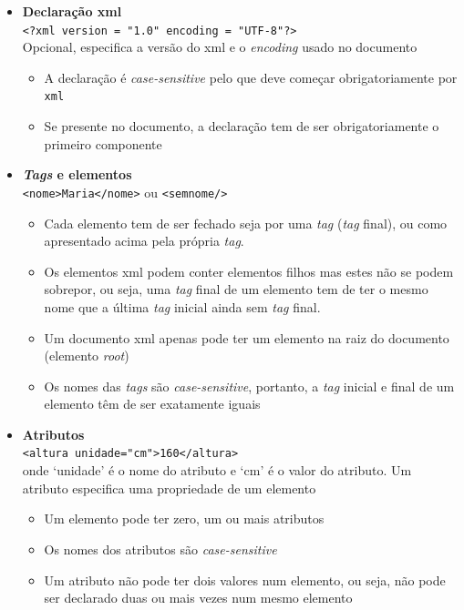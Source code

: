 \begin{itemize}
    \item \textbf{Declaração \acrshort{xml}} \\
    \verb|<?xml version = "1.0" encoding = "UTF-8"?>| \\
    Opcional, especifica a versão do \acrshort{xml} e o \textit{encoding} usado no documento
    \begin{itemize}
        \item A declaração é \textit{case-sensitive} pelo que deve começar obrigatoriamente por \texttt{xml}
        \item Se presente no documento, a declaração tem de ser obrigatoriamente o primeiro componente
    \end{itemize}
    \item \textbf{\textit{Tags} e elementos} \\
    \verb|<nome>Maria</nome>| ou \verb|<semnome/>|
    \begin{itemize}
        \item Cada elemento tem de ser fechado seja por uma \textit{tag} (\textit{tag} final), ou como apresentado acima pela própria \textit{tag}.
        \item Os elementos \acrshort{xml} podem conter elementos filhos mas estes não se podem sobrepor, ou seja, uma \textit{tag} final de um elemento tem de ter o mesmo nome que a última \textit{tag} inicial ainda sem \textit{tag} final. 
        \item Um documento \acrshort{xml} apenas pode ter um elemento na raiz do documento (elemento \textit{root})
        \item Os nomes das \textit{tags} são \textit{case-sensitive}, portanto, a \textit{tag} inicial e final de um elemento têm de ser exatamente iguais
    \end{itemize}
    \item \textbf{Atributos} \\
    \verb|<altura unidade="cm">160</altura>| \\
    onde `unidade' é o nome do atributo e `cm' é o valor do atributo. Um atributo especifica uma propriedade de um elemento
    \begin{itemize}
        \item Um elemento pode ter zero, um ou mais atributos
        \item Os nomes dos atributos são \textit{case-sensitive}
        \item Um atributo não pode ter dois valores num elemento, ou seja, não pode ser declarado duas ou mais vezes num mesmo elemento

\end{itemize}
\end{itemize}
